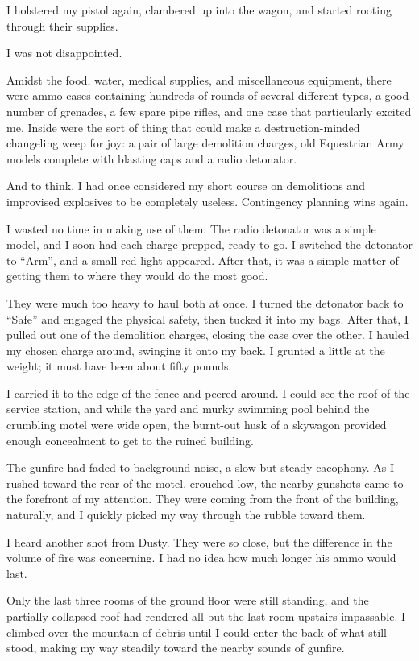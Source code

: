 I holstered my pistol again, clambered up into the wagon, and started rooting through their supplies.

I was not disappointed.

Amidst the food, water, medical supplies, and miscellaneous equipment, there were ammo cases containing hundreds of rounds of several different types, a good number of grenades, a few spare pipe rifles, and one case that particularly excited me. Inside were the sort of thing that could make a destruction-minded changeling weep for joy: a pair of large demolition charges, old Equestrian Army models complete with blasting caps and a radio detonator.

And to think, I had once considered my short course on demolitions and improvised explosives to be completely useless. Contingency planning wins again.

I wasted no time in making use of them. The radio detonator was a simple model, and I soon had each charge prepped, ready to go. I switched the detonator to “Arm”, and a small red light appeared. After that, it was a simple matter of getting them to where they would do the most good.

They were much too heavy to haul both at once. I turned the detonator back to “Safe” and engaged the physical safety, then tucked it into my bags. After that, I pulled out one of the demolition charges, closing the case over the other. I hauled my chosen charge around, swinging it onto my back. I grunted a little at the weight; it must have been about fifty pounds.

I carried it to the edge of the fence and peered around. I could see the roof of the service station, and while the yard and murky swimming pool behind the crumbling motel were wide open, the burnt-out husk of a skywagon provided enough concealment to get to the ruined building.

The gunfire had faded to background noise, a slow but steady cacophony. As I rushed toward the rear of the motel, crouched low, the nearby gunshots came to the forefront of my attention. They were coming from the front of the building, naturally, and I quickly picked my way through the rubble toward them.

I heard another shot from Dusty. They were so close, but the difference in the volume of fire was concerning. I had no idea how much longer his ammo would last.

Only the last three rooms of the ground floor were still standing, and the partially collapsed roof had rendered all but the last room upstairs impassable. I climbed over the mountain of debris until I could enter the back of what still stood, making my way steadily toward the nearby sounds of gunfire.

